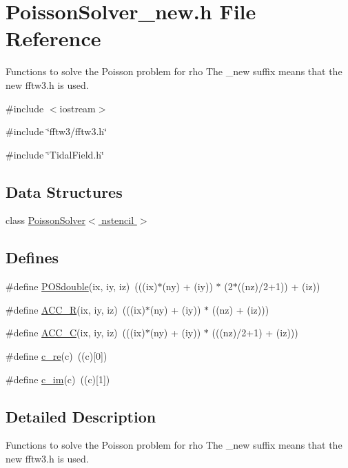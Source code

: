 \section{PoissonSolver\_\-new.h File Reference}
\label{PoissonSolver__new_8h}


Functions to solve the Poisson problem for rho The \_\-new suffix means that the new fftw3.h is used.  


{\ttfamily \#include $<$iostream$>$}\par
{\ttfamily \#include \char`\"{}fftw3/fftw3.h\char`\"{}}\par
{\ttfamily \#include \char`\"{}TidalField.h\char`\"{}}\par
\subsection*{Data Structures}
\begin{DoxyCompactItemize}
\item 
class \hyperlink{classPoissonSolver}{PoissonSolver$<$ nstencil $>$}
\end{DoxyCompactItemize}
\subsection*{Defines}
\begin{DoxyCompactItemize}
\item 
\#define \hyperlink{PoissonSolver__new_8h_a57c2f618d21bf58344c3d10ce4eb0425}{POSdouble}(ix, iy, iz)~(((ix)$\ast$(ny) + (iy)) $\ast$ (2$\ast$((nz)/2+1)) + (iz))
\item 
\#define \hyperlink{PoissonSolver__new_8h_a2893f2854bb6eb4f81510181ef7da98d}{ACC\_\-R}(ix, iy, iz)~(((ix)$\ast$(ny) + (iy)) $\ast$ ((nz) + (iz)))
\item 
\#define \hyperlink{PoissonSolver__new_8h_aa0ec3c1fa56accaf6945ccf59d19ec4a}{ACC\_\-C}(ix, iy, iz)~(((ix)$\ast$(ny) + (iy)) $\ast$ (((nz)/2+1) + (iz)))
\item 
\#define \hyperlink{PoissonSolver__new_8h_a2dd4d4bcc83b191ea626047687be5d08}{c\_\-re}(c)~((c)\mbox{[}0\mbox{]})
\item 
\#define \hyperlink{PoissonSolver__new_8h_a9a1e7710dc40249339b87ca5321cdb9a}{c\_\-im}(c)~((c)\mbox{[}1\mbox{]})
\end{DoxyCompactItemize}


\subsection{Detailed Description}
Functions to solve the Poisson problem for rho The \_\-new suffix means that the new fftw3.h is used. 


